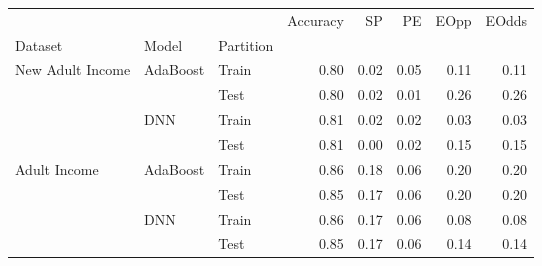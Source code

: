 \begin{tabular}{lllrrrrr}
\toprule
             &     &      &  Accuracy &    SP &    PE &  EOpp &  EOdds \\
Dataset & Model & Partition &           &       &       &       &        \\
\midrule
\multirow{4}{*}{New Adult Income} & \multirow{2}{*}{AdaBoost} & Train &      0.80 &  0.02 &  0.05 &  0.11 &   0.11 \\
             &     & Test &      0.80 &  0.02 &  0.01 &  0.26 &   0.26 \\
\cline{2-8}
             & \multirow{2}{*}{DNN} & Train &      0.81 &  0.02 &  0.02 &  0.03 &   0.03 \\
             &     & Test &      0.81 &  0.00 &  0.02 &  0.15 &   0.15 \\
\cline{1-8}
\cline{2-8}
\multirow{4}{*}{Adult Income} & \multirow{2}{*}{AdaBoost} & Train &      0.86 &  0.18 &  0.06 &  0.20 &   0.20 \\
             &     & Test &      0.85 &  0.17 &  0.06 &  0.20 &   0.20 \\
\cline{2-8}
             & \multirow{2}{*}{DNN} & Train &      0.86 &  0.17 &  0.06 &  0.08 &   0.08 \\
             &     & Test &      0.85 &  0.17 &  0.06 &  0.14 &   0.14 \\
\bottomrule
\end{tabular}
